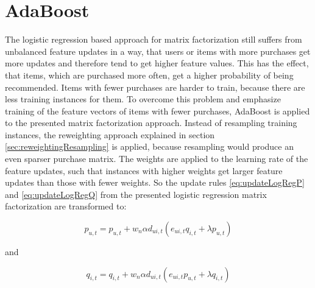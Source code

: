 \documentclass[10pt]{reportMaster}
\begin{document}
\section{AdaBoost}
\label{sec:myAdaBoost}
The logistic regression based approach for matrix factorization still suffers from unbalanced feature updates in a way, that users or items with more purchases get more updates and therefore tend to get higher feature values.
This has the effect, that items, which are purchased more often, get a higher probability of being recommended.
Items with fewer purchases are harder to train, because there are less training instances for them.
To overcome this problem and emphasize training of the feature vectors of items with fewer purchases, AdaBoost is applied to the presented matrix factorization approach.
Instead of resampling training instances, the reweighting approach explained in section \ref{sec:reweightingResampling} is applied, because resampling would produce an even sparser purchase matrix.
The weights are applied to the learning rate of the feature updates, such that instances with higher weights get larger feature updates than those with fewer weights.
So the update rules \ref{eq:updateLogRegP} and \ref{eq:updateLogRegQ} from the presented logistic regression matrix factorization are transformed to: 

\begin{equation}
p_{u,t} = p_{u,t} + w_n \alpha d_{ui,t} (e_{ui,t} q_{i,t} + \lambda p_{u,t})
\end{equation}

and 

\begin{equation}
q_{i,t} = q_{i,t} + w_n \alpha d_{ui,t} (e_{ui,t} p_{u,t} + \lambda q_{i,t})
\end{equation}
\end{document}
